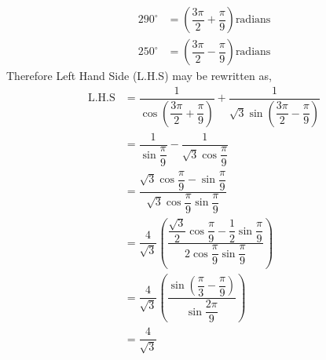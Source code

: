 \begin{solution}
  \begin{align}     
    290^\circ &= \left(\dfrac{3\pi}{2}+\dfrac{\pi}{9}\right) 
      \text{radians} \\
    250^\circ &= \left(\dfrac{3\pi}{2}-\dfrac{\pi}{9}\right) 
      \text{radians}
  \end{align}
  Therefore Left Hand Side (L.H.S) may be rewritten as,
  \begin{align}
    \text{L.H.S} &= \dfrac{1}{\cos(\dfrac{3\pi}{2}+\dfrac{\pi}{9})}+
      				  \dfrac{1}{\sqrt{3}
      				    \sin(\dfrac{3\pi}{2}-\dfrac{\pi}{9})} \\
      		     &= \dfrac{1}{\sin\dfrac{\pi}{9}}-
      				  \dfrac{1}{\sqrt{3}\cos\dfrac{\pi}{9}} \\
      		     &= \dfrac{\sqrt{3}\cos\dfrac{\pi}{9}-\sin\dfrac{\pi}{9}}
      		              {\sqrt{3}\cos\dfrac{\pi}{9}\sin\dfrac{\pi}{9}} \\
      		     &= \dfrac{4}{\sqrt{3}}\left(
      		          \dfrac{\dfrac{\sqrt{3}}{2}\cos\dfrac{\pi}{9}-
      		                         \dfrac{1}{2}\sin\dfrac{\pi}{9}}
            		               {2\cos\dfrac{\pi}{9}
            		                 \sin\dfrac{\pi}{9}}\right) \\
      		     &= \dfrac{4}{\sqrt{3}}\left(
      		          \dfrac{\sin(\dfrac{\pi}{3}-\dfrac{\pi}{9})}
      		                {\sin\dfrac{2\pi}{9}}\right) \\
      		     &= \dfrac{4}{\sqrt{3}}
  \end{align}
\end{solution}
